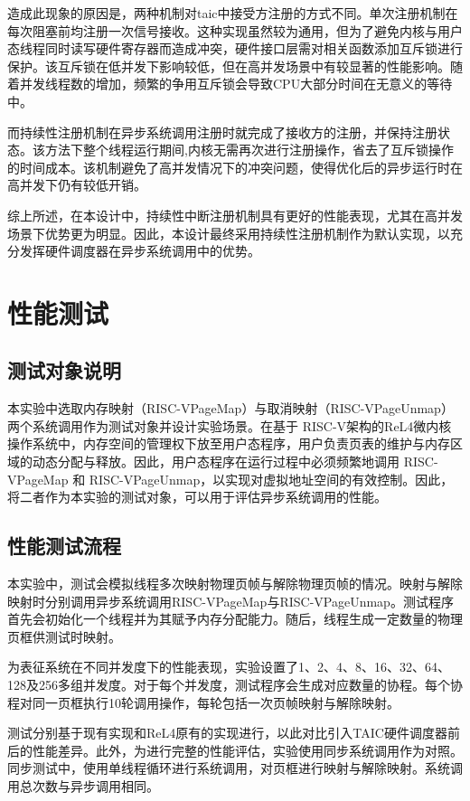 造成此现象的原因是，两种机制对taic中接受方注册的方式不同。单次注册机制在每次阻塞前均注册一次信号接收。这种实现虽然较为通用，但为了避免内核与用户态线程同时读写硬件寄存器而造成冲突，硬件接口层需对相关函数添加互斥锁进行保护。该互斥锁在低并发下影响较低，但在高并发场景中有较显著的性能影响。随着并发线程数的增加，频繁的争用互斥锁会导致CPU大部分时间在无意义的等待中。

而持续性注册机制在异步系统调用注册时就完成了接收方的注册，并保持注册状态。该方法下整个线程运行期间,内核无需再次进行注册操作，省去了互斥锁操作的时间成本。该机制避免了高并发情况下的冲突问题，使得优化后的异步运行时在高并发下仍有较低开销。

综上所述，在本设计中，持续性中断注册机制具有更好的性能表现，尤其在高并发场景下优势更为明显。因此，本设计最终采用持续性注册机制作为默认实现，以充分发挥硬件调度器在异步系统调用中的优势。

\section{性能测试}

\subsection{测试对象说明}

本实验中选取内存映射（RISC-VPageMap）与取消映射（RISC-VPageUnmap）两个系统调用作为测试对象并设计实验场景。在基于 RISC-V架构的ReL4微内核操作系统中，内存空间的管理权下放至用户态程序，用户负责页表的维护与内存区域的动态分配与释放。因此，用户态程序在运行过程中必须频繁地调用 RISC-VPageMap 和 RISC-VPageUnmap，以实现对虚拟地址空间的有效控制。因此，将二者作为本实验的测试对象，可以用于评估异步系统调用的性能。

\subsection{性能测试流程}

本实验中，测试会模拟线程多次映射物理页帧与解除物理页帧的情况。映射与解除映射时分别调用异步系统调用RISC-VPageMap与RISC-VPageUnmap。测试程序首先会初始化一个线程并为其赋予内存分配能力。随后，线程生成一定数量的物理页框供测试时映射。

为表征系统在不同并发度下的性能表现，实验设置了1、2、4、8、16、32、64、128及256多组并发度。对于每个并发度，测试程序会生成对应数量的协程。每个协程对同一页框执行10轮调用操作，每轮包括一次页帧映射与解除映射。

测试分别基于现有实现和ReL4原有的实现进行，以此对比引入TAIC硬件调度器前后的性能差异。此外，为进行完整的性能评估，实验使用同步系统调用作为对照。同步测试中，使用单线程循环进行系统调用，对页框进行映射与解除映射。系统调用总次数与异步调用相同。

